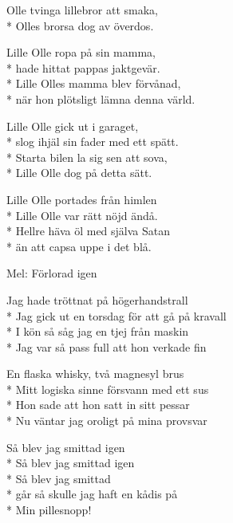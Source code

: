 \begin{SongText}
\begin{SongVerse}
        Olle tvinga lillebror att smaka,\\*%
        Olles brorsa dog av överdos.
    \end{SongVerse}
    \begin{SongVerse}
        Lille Olle ropa på sin mamma,\\*%
        hade hittat pappas jaktgevär.\\*%
        Lille Olles mamma blev förvånad,\\*%
        när hon plötsligt lämna denna värld.
    \end{SongVerse}
    \begin{SongVerse}
        Lille Olle gick ut i garaget,\\*%
        slog ihjäl sin fader med ett spätt.\\*%
        Starta bilen la sig sen att sova,\\*%
        Lille Olle dog på detta sätt.
    \end{SongVerse}
    \begin{SongVerse}
        Lille Olle portades från himlen\\*%
        Lille Olle var rätt nöjd ändå.\\*%
        Hellre häva öl med själva Satan\\*%
        än att capsa uppe i det blå.
    \end{SongVerse}
\end{SongText}
\begin{SongText}
    \begin{SongInfo}
        Mel: Förlorad igen
    \end{SongInfo}
    \begin{SongVerse}
        Jag hade tröttnat på högerhandstrall\\*%
        Jag gick ut en torsdag för att gå på kravall\\*%
        I kön så såg jag en tjej från maskin\\*%
        Jag var så pass full att hon verkade fin
    \end{SongVerse}
    \begin{SongVerse}
        En flaska whisky, två magnesyl brus\\*%
        Mitt logiska sinne försvann med ett sus\\*%
        Hon sade att hon satt in sitt pessar\\*%
        Nu väntar jag oroligt på mina provsvar
    \end{SongVerse}
    \begin{SongVerse}
        Så blev jag smittad igen\\*%
        Så blev jag smittad igen\\*%
        Så blev jag smittad\\*%
        går så skulle jag haft en kådis på\\*%
        Min pillesnopp!
    \end{SongVerse}
\end{SongText}
